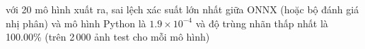 với 20 mô hình xuất ra, sai lệch xác suất lớn nhất giữa ONNX (hoặc bộ đánh giá nhị phân) và mô hình Python là $1.9\times10^{-4}$ và độ trùng nhãn thấp nhất là 100.00\% (trên 2\,000 ảnh test cho mỗi mô hình)%
